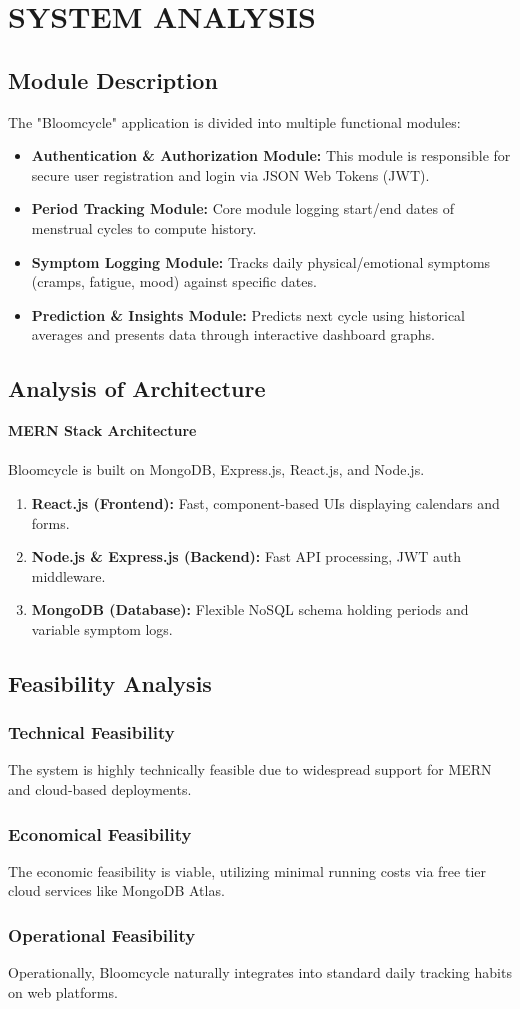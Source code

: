 \chapter{SYSTEM ANALYSIS}
 
 \section{Module Description}
 The "Bloomcycle" application is divided into multiple functional modules:
 \begin{itemize}
    \item \textbf{Authentication \& Authorization Module:} This module is responsible for secure user registration and login via JSON Web Tokens (JWT).
    \item \textbf{Period Tracking Module:} Core module logging start/end dates of menstrual cycles to compute history.
    \item \textbf{Symptom Logging Module:} Tracks daily physical/emotional symptoms (cramps, fatigue, mood) against specific dates.
    \item \textbf{Prediction \& Insights Module:} Predicts next cycle using historical averages and presents data through interactive dashboard graphs.
\end{itemize}

\section{Analysis of Architecture}
{\large \textbf{MERN Stack Architecture}}\\\\
Bloomcycle is built on MongoDB, Express.js, React.js, and Node.js.
\begin{enumerate}
    \item \textbf{React.js (Frontend):} Fast, component-based UIs displaying calendars and forms.
    \item \textbf{Node.js \& Express.js (Backend):} Fast API processing, JWT auth middleware.
    \item \textbf{MongoDB (Database):} Flexible NoSQL schema holding periods and variable symptom logs.
\end{enumerate}

\section{Feasibility Analysis}
\subsection{Technical Feasibility}
The system is highly technically feasible due to widespread support for MERN and cloud-based deployments.
\subsection{Economical Feasibility}
The economic feasibility is viable, utilizing minimal running costs via free tier cloud services like MongoDB Atlas.
\subsection{Operational Feasibility}
Operationally, Bloomcycle naturally integrates into standard daily tracking habits on web platforms.